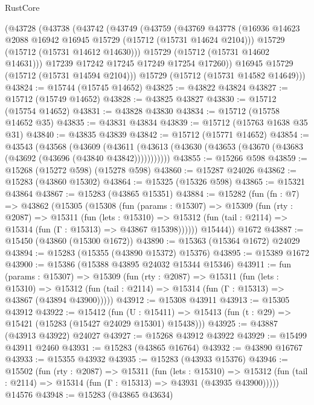 \begin{lexlean}{RustCore}
\begin{coremodule}
    (@43728
      (@43738
        (@43742
          (@43749
            (@43759
              (@43769
                @43778
                (@16936 @14623 @2088 @16942 @16945 @15729 (@15712 (@15731 @14624 @2104)))
                @15729
                (@15712 (@15731 @14612 @14630)))
              @15729
              (@15712 (@15731 @14602 @14631)))
            @17239
            @17242
            @17245
            @17249
            @17254
            @17260))
        @16945
        @15729
        (@15712 (@15731 @14594 @2104)))
      @15729
      (@15712 (@15731 @14582 @14649)))
@43824 := @15744 (@15745 @14652)
@43825 := @43822 @43824
@43827 := @15712 (@15749 @14652)
@43828 := @43825 @43827
@43830 := @15712 (@15754 @14652)
@43831 := @43828 @43830
@43834 := @15712 (@15758 @14652 @35)
@43835 := @43831 @43834
@43839 := @15712 (@15763 @1638 @35 @31)
@43840 := @43835 @43839
@43842 := @15712 (@15771 @14652)
@43854 := @43543
    (@43568
      (@43609
        (@43611 (@43613 (@43630 (@43653 (@43670 (@43683 (@43692 (@43696 (@43840 @43842)))))))))))
@43855 := @15266 @598
@43859 := @15268 (@15272 @598) (@15278 @598)
@43860 := @15287 @24026
@43862 := @15283 (@43860 @15302)
@43864 := @15325 (@15326 @598)
@43865 := @15321 @43864
@43867 := @15283 (@43865 @15351)
@43884 := @15282
    (fun (fn : @7) =>
    @43862
      (@15305
        (@15308
          (fun (params : @15307) =>
          @15309
            (fun (rty : @2087) =>
            @15311
              (fun (lets : @15310) =>
              @15312 (fun (tail : @2114) => @15314 (fun (Γ : @15313) => @43867 @15398))))))
        @15444))
    @1672
@43887 := @15450 (@43860 (@15300 @1672))
@43890 := @15363 (@15364 @1672) @24029
@43894 := @15283 (@15355 (@43890 @15372) @15376)
@43895 := @15389 @1672
@43900 := @15386 (@15388 @43895 @24032 @15344 @15346)
@43911 := fun (params : @15307) =>
  @15309
    (fun (rty : @2087) =>
    @15311
      (fun (lets : @15310) =>
      @15312 (fun (tail : @2114) => @15314 (fun (Γ : @15313) => @43867 (@43894 @43900)))))
@43912 := @15308 @43911
@43913 := @15305 @43912
@43922 := @15412
    (fun (U : @15411) => @15413 (fun (t : @29) => @15421 (@15283 (@15427 @24029 @15301) @15438)))
@43925 := @43887 (@43913 @43922) @24027
@43927 := @15268 @43912 @43922
@43929 := @15499 @43911 @2460
@43931 := @15283 (@43865 @16764)
@43932 := @43890 @16767
@43933 := @15355 @43932
@43935 := @15283 (@43933 @15376)
@43946 := @15502
    (fun (rty : @2087) =>
    @15311
      (fun (lets : @15310) =>
      @15312 (fun (tail : @2114) => @15314 (fun (Γ : @15313) => @43931 (@43935 @43900)))))
    @14576
@43948 := @15283 (@43865 @43634)

\end{coremodule}
\end{lexlean}
